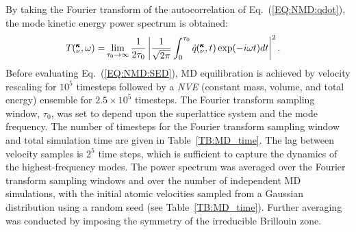 \documentclass[aps,prb,preprint,preprintnumbers,amsmath,amssymb,floatfix,superscriptaddress]{revtex4}
\newcommand{\kvt}{\mspace{-4.0mu}\left(\mspace{-8.0mu}
\begin{smallmatrix}&\pmb{\kappa} \\&\nu\end{smallmatrix}
\mspace{-2.0mu},t\right)}
\newcommand{\kvw}{\mspace{-4.0mu}\left(\mspace{-8.0mu}
\begin{smallmatrix}&\pmb{\kappa} \\&\nu\end{smallmatrix}
\mspace{-2.0mu},\omega\right)}
\begin{document}
By taking the Fourier transform of the autocorrelation of Eq.~(\ref{EQ:NMD:qdot}), the mode kinetic energy power spectrum is obtained: \cite{dove_introduction_1993-3}
\begin{equation}\label{EQ:NMD:SED}
\begin{split}
T\kvw=&\lim_{\tau_0\rightarrow\infty}\frac{1}{2\tau_0}\left|\frac{1}{\sqrt{2\pi}}\int_{0}^{\tau_0}\dot{q}\kvt\exp(-i\omega t)dt\right|^2.
\end{split}
\end{equation}
Before evaluating Eq.~(\ref{EQ:NMD:SED}), MD equilibration is achieved by velocity rescaling for $10^5$ timesteps followed by a \textit{NVE} (constant mass, volume, and total energy) ensemble for $2.5 \times10^5$ timesteps. The Fourier transform sampling window, $\tau_0$, was set to depend upon the superlattice system and the mode frequency. The number of timesteps for the Fourier transform sampling window and total simulation time are given in Table~\ref{TB:MD_time}. The lag between velocity samples is $2^5$ time steps, which is sufficient to capture the dynamics of the highest-frequency modes. The power spectrum was averaged over the Fourier transform sampling windows and over the number of independent MD simulations, with the initial atomic velocities sampled from a Gaussian distribution using a random seed (see Table~\ref{TB:MD_time}). Further averaging was conducted by imposing the symmetry of the irreducible Brillouin zone. 
\end{document}
